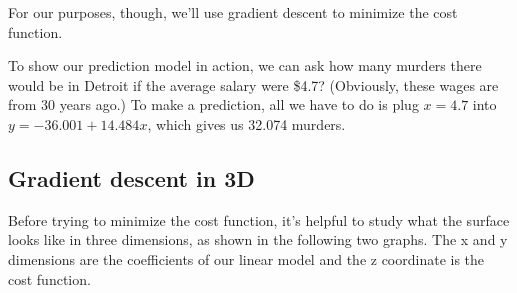 \begin{fullwidth}
\noindent For our purposes, though, we'll use gradient descent to minimize the cost function.

To show our prediction model in action, we can ask how many murders  there would be in Detroit if the average salary were \$4.7? (Obviously, these wages are from 30 years ago.) To make a prediction, all we have to do is plug $x=4.7$ into $y = -36.001 + 14.484 x$, which gives us 32.074 murders.

\subsection{Gradient descent in 3D}

Before trying to minimize the cost function, it's helpful to study what the surface looks like in three dimensions, as shown in the following two graphs. The x and y dimensions are the coefficients of our linear model and the z coordinate is the cost function.

\noindent {}


\end{fullwidth}
